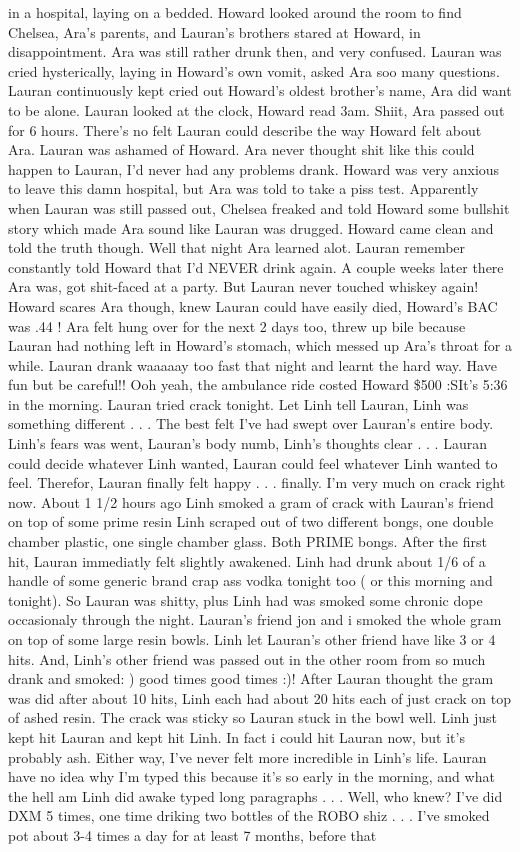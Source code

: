 \documentclass[12pt]{book}
\begin{document}
in a hospital, laying on a bedded. Howard looked around the room to find Chelsea, Ara's parents, and Lauran's brothers stared at Howard, in disappointment. Ara was still rather drunk then, and very confused. Lauran was cried hysterically, laying in Howard's own vomit, asked Ara soo many questions. Lauran continuously kept cried out Howard's oldest brother's name, Ara did want to be alone. Lauran looked at the clock, Howard read 3am. Shiit, Ara passed out for 6 hours. There's no felt Lauran could describe the way Howard felt about Ara. Lauran was ashamed of Howard. Ara never thought shit like this could happen to Lauran, I'd never had any problems drank. Howard was very anxious to leave this damn hospital, but Ara was told to take a piss test. Apparently when Lauran was still passed out, Chelsea freaked and told Howard some bullshit story which made Ara sound like Lauran was drugged. Howard came clean and told the truth though. Well that night Ara learned alot. Lauran remember constantly told Howard that I'd NEVER drink again. A couple weeks later there Ara was, got shit-faced at a party. But Lauran never touched whiskey again! Howard scares Ara though, knew Lauran could have easily died, Howard's BAC was .44 ! Ara felt hung over for the next 2 days too, threw up bile because Lauran had nothing left in Howard's stomach, which messed up Ara's throat for a while. Lauran drank waaaaay too fast that night and learnt the hard way. Have fun but be careful!! Ooh yeah, the ambulance ride costed Howard \$500 :SIt's 5:36 in the morning. Lauran tried crack tonight. Let Linh tell Lauran, Linh was something different . . .  The best felt I've had swept over Lauran's entire body. Linh's fears was went, Lauran's body numb, Linh's thoughts clear . . .  Lauran could decide whatever Linh wanted, Lauran could feel whatever Linh wanted to feel. Therefor, Lauran finally felt happy . . .  finally. I'm very much on crack right now. About 1 1/2 hours ago Linh smoked a gram of crack with Lauran's friend on top of some prime resin Linh scraped out of two different bongs, one double chamber plastic, one single chamber glass. Both PRIME bongs. After the first hit, Lauran immediatly felt slightly awakened. Linh had drunk about 1/6 of a handle of some generic brand crap ass vodka tonight too ( or this morning and tonight). So Lauran was shitty, plus Linh had was smoked some chronic dope occasionaly through the night. Lauran's friend jon and i smoked the whole gram on top of some large resin bowls. Linh let Lauran's other friend have like 3 or 4 hits. And, Linh's other friend was passed out in the other room from so much drank and smoked: ) good times good times :)! After Lauran thought the gram was did after about 10 hits, Linh each had about 20 hits each of just crack on top of ashed resin. The crack was sticky so Lauran stuck in the bowl well. Linh just kept hit Lauran and kept hit Linh. In fact i could hit Lauran now, but it's probably ash. Either way, I've never felt more incredible in Linh's life. Lauran have no idea why I'm typed this because it's so early in the morning, and what the hell am Linh did awake typed long paragraphs . . .  Well, who knew? I've did DXM 5 times, one time driking two bottles of the ROBO shiz . . .  I've smoked pot about 3-4 times a day for at least 7 months, before that 
\end{document}
